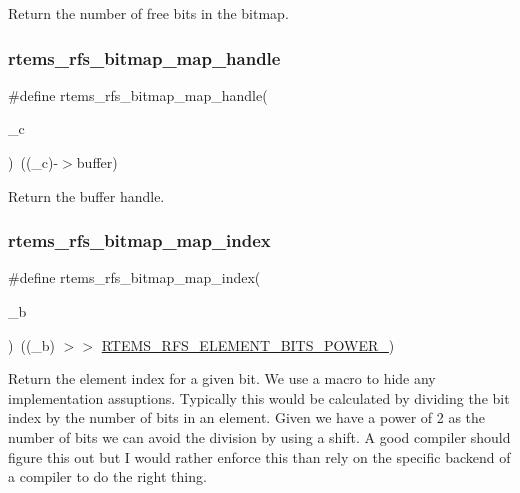 Return the number of free bits in the bitmap. \mbox{\label{rtems-rfs-bitmaps_8h_a8b9a67764746ff36aea1f5c3c85b4349}} 
\subsubsection{\texorpdfstring{rtems\_rfs\_bitmap\_map\_handle}{rtems\_rfs\_bitmap\_map\_handle}}
{\footnotesize\ttfamily \#define rtems\+\_\+rfs\+\_\+bitmap\+\_\+map\+\_\+handle(\begin{DoxyParamCaption}\item[{}]{\+\_\+c }\end{DoxyParamCaption})~((\+\_\+c)-\/$>$buffer)}

Return the buffer handle. \mbox{\label{rtems-rfs-bitmaps_8h_a6becee21763009245244280533e33637}} 
\subsubsection{\texorpdfstring{rtems\_rfs\_bitmap\_map\_index}{rtems\_rfs\_bitmap\_map\_index}}
{\footnotesize\ttfamily \#define rtems\+\_\+rfs\+\_\+bitmap\+\_\+map\+\_\+index(\begin{DoxyParamCaption}\item[{}]{\+\_\+b }\end{DoxyParamCaption})~((\+\_\+b) $>$$>$ \mbox{\hyperlink{rtems-rfs-bitmaps_8h_a50825eb249f04b99969055b75f2da875}{R\+T\+E\+M\+S\+\_\+\+R\+F\+S\+\_\+\+E\+L\+E\+M\+E\+N\+T\+\_\+\+B\+I\+T\+S\+\_\+\+P\+O\+W\+E\+R\+\_}})}

Return the element index for a given bit. We use a macro to hide any implementation assuptions. Typically this would be calculated by dividing the bit index by the number of bits in an element. Given we have a power of 2 as the number of bits we can avoid the division by using a shift. A good compiler should figure this out but I would rather enforce this than rely on the specific backend of a compiler to do the right thing. \mbox{\label{rtems-rfs-bitmaps_8h_ae9076b7c3012744e43636f2d6e5846e9}} 
